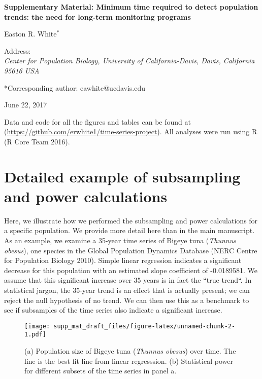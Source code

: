 \documentclass[12pt,]{article}
\title{}
\author{}
\date{}
\begin{document}
\vspace{2cm}

\begin{center}
 \textbf{Supplementary Material: Minimum time required to detect population trends: the need for long-term monitoring programs}
 
Easton R. White$^{*}$
\vspace{3 mm}

Address: \\ \emph{Center for Population Biology, University of California-Davis, Davis, California 95616 USA}

*Corresponding author: eawhite@ucdavis.edu

June 22, 2017
 \end{center}

\vspace{2cm}

\tableofcontents

\vspace{1cm}

Data and code for all the figures and tables can be found at
(\url{https://github.com/erwhite1/time-series-project}). All analyses
were run using R (R Core Team 2016).

\vspace{2cm}

\clearpage

\section{Detailed example of subsampling and power
calculations}\label{detailed-example-of-subsampling-and-power-calculations}

Here, we illustrate how we performed the subsampling and power
calculations for a specific population. We provide more detail here than
in the main manuscript. As an example, we examine a 35-year time series
of Bigeye tuna (\emph{Thunnus obesus}), one species in the Global
Population Dynamics Database (NERC Centre for Population Biology 2010).
Simple linear regression indicates a significant decrease for this
population with an estimated slope coefficient of -0.0189581. We assume
that this significant increase over 35 years is in fact the ``true
trend``. In statistical jargon, the 35-year trend is an effect that is
actually present; we can reject the null hypothesis of no trend. We can
then use this as a benchmark to see if subsamples of the time series
also indicate a significant increase.

\begin{figure}[htbp]
\centering
\texttt{[image: supp\_mat\_draft\_files/figure-latex/unnamed-chunk-2-1.pdf]}
\caption{(a) Population size of Bigeye tuna (\emph{Thunnus obesus}) over
time. The line is the best fit line from linear regresssion. (b)
Statistical power for different subsets of the time series in panel
a.\label{fig:empirical_approach_example}}
\end{figure}
\end{document}
